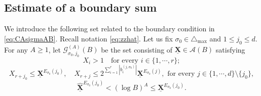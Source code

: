 \documentclass[11pt,letterpaper]{amsart}
\newcommand{\CA}{{\mathcal {A}}}
\newcommand{\CG}{{\mathcal {G}}}
\newcommand{\XX}{\underline{\mathbf{X}}}
\theoremstyle{plain}
\numberwithin{equation}{section}
\theoremstyle{definition}
\theoremstyle{remark}
\begin{document}
\subsection{Estimate of a boundary sum}\label{se:bdsumvandercorput}
We introduce the following set related to the boundary condition in \eqref{eq:CAsigmaAB}. Recall notation \eqref{eq:zzhat}. Let us fix $\sigma_0\in\triangle_{\max}$ and $1\leqslant j_0\leqslant d$.
For any $A\geqslant 1$, let $\CG_{\sigma_0,j_0}^{(A)}(B)$ be the set consisting of $\XX\in\CA(B)$ satisfying
$$X_{i}>1\quad \text{for every } i\in\{1,\cdots,r\};$$
\begin{equation}\label{eq:CGsigmaA}
	X_{r+j_0}\leqslant \XX^{E_{\sigma_0}(j_0)} ,\quad X_{r+j}\leqslant 2^{\sum_{i=1}^{r}|b_i^{(j,\sigma_0)}|}\XX^{E_{\sigma_0}(j)},\text{ for every }j\in\{1,\cdots,d\}\setminus\{j_0\},
\end{equation} 
 \begin{equation}\label{eq:condpos}
		\widehat{\XX}^{E_{\sigma_0}(j_0)}<(\log B)^A\leqslant \XX^{E_{\sigma_0}(j_0)}.
	\end{equation}
\end{document}
